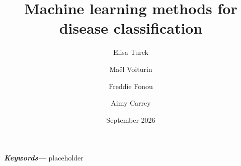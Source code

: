 \documentclass[12pt,a4paper]{article}
\title{Machine learning methods for disease classification}
\author[1]{Elisa Turck}
\author[1]{Maël Voiturin}
\author[1]{Freddie Fonou}
\author[1]{Aimy Carrey}
\affil[1]{Department of bioinformatics, Université de Bordeaux}
\date{September 2026}
\begin{document}
\maketitle
\begin{sloppypar}

\providecommand{\keywords}[1]
{
  \small	
  \textbf{\textit{Keywords---}} #1
}
\begin{abstract}
    \lipsum[1]
\end{abstract}

\keywords{placeholder}


\newpage





\end{sloppypar}
\end{document}
